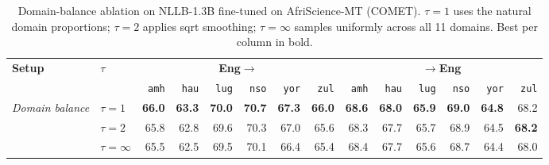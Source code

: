 \begin{table}[t]
\centering
\small
\renewcommand{\arraystretch}{1.05}
\begin{tabular}{llrrrrrrrrrrrr}
\toprule
\textbf{Setup} & \textbf{$\tau$} & \multicolumn{6}{c}{\textbf{Eng$\to$}} & \multicolumn{6}{c}{\textbf{$\to$Eng}} \\
\cmidrule(lr){3-8}\cmidrule(lr){9-14}
  &   & \texttt{amh} & \texttt{hau} & \texttt{lug} & \texttt{nso} & \texttt{yor} & \texttt{zul} & \texttt{amh} & \texttt{hau} & \texttt{lug} & \texttt{nso} & \texttt{yor} & \texttt{zul} \\
\midrule
\multirow{3}{*}{\textit{Domain balance}} & $\tau{=}1$ & \textbf{66.0} & \textbf{63.3} & \textbf{70.0} & \textbf{70.7} & \textbf{67.3} & \textbf{66.0} & \textbf{68.6} & \textbf{68.0} & \textbf{65.9} & \textbf{69.0} & \textbf{64.8} & 68.2 \\
 & $\tau{=}2$ & 65.8 & 62.8 & 69.6 & 70.3 & 67.0 & 65.6 & 68.3 & 67.7 & 65.7 & 68.9 & 64.5 & \textbf{68.2} \\
 & $\tau{=}\infty$ & 65.5 & 62.5 & 69.5 & 70.1 & 66.4 & 65.4 & 68.4 & 67.7 & 65.6 & 68.7 & 64.4 & 68.0 \\
\bottomrule
\end{tabular}
\caption{Domain-balance ablation on NLLB-1.3B fine-tuned on AfriScience-MT (COMET). $\tau{=}1$ uses the natural domain proportions; $\tau{=}2$ applies sqrt smoothing; $\tau{=}\infty$ samples uniformly across all 11 domains. Best per column in bold.}
\label{tab:balance_comet}
\end{table}
